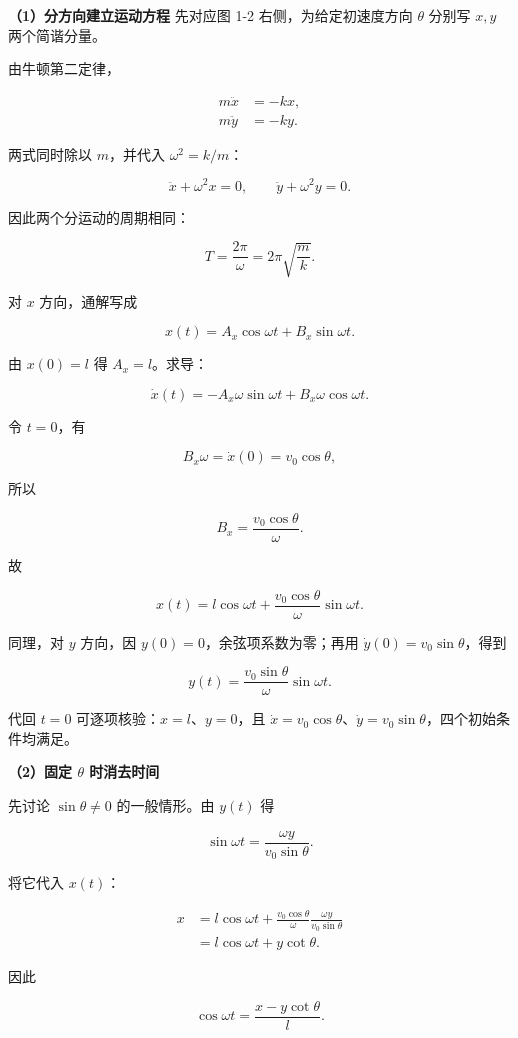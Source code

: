 \documentclass[12pt,a4paper,UTF8]{ctexart}
\begin{document}
\textbf{（1）分方向建立运动方程} 先对应图 1-2 右侧，为给定初速度方向
\(\theta\) 分别写 \(x,y\) 两个简谐分量。

由牛顿第二定律，

\[\begin{aligned}
m\ddot x&=-kx,\\
m\ddot y&=-ky.
\end{aligned}\]

两式同时除以 \(m\)，并代入 \(\omega^2=k/m\)：

\[\ddot x+\omega^2x=0,\qquad \ddot y+\omega^2y=0.\]

因此两个分运动的周期相同：

\[\boxed{T=\frac{2\pi}{\omega}=2\pi\sqrt{\frac{m}{k}}}.\]

对 \(x\) 方向，通解写成

\[x(t)=A_x\cos\omega t+B_x\sin\omega t.\]

由 \(x(0)=l\) 得 \(A_x=l\)。求导：

\[\dot x(t)=-A_x\omega\sin\omega t+B_x\omega\cos\omega t.\]

令 \(t=0\)，有

\[B_x\omega=\dot x(0)=v_0\cos\theta,\]

所以

\[B_x=\frac{v_0\cos\theta}{\omega}.\]

故

\[\boxed{x(t)=l\cos\omega t+\frac{v_0\cos\theta}{\omega}\sin\omega t}.\]

同理，对 \(y\) 方向，因 \(y(0)=0\)，余弦项系数为零；再用
\(\dot y(0)=v_0\sin\theta\)，得到

\[\boxed{y(t)=\frac{v_0\sin\theta}{\omega}\sin\omega t}.\]

代回 \(t=0\) 可逐项核验：\(x=l\)、\(y=0\)，且
\(\dot x=v_0\cos\theta\)、\(\dot y=v_0\sin\theta\)，四个初始条件均满足。

\textbf{（2）固定 \(\theta\) 时消去时间}

先讨论 \(\sin\theta\neq0\) 的一般情形。由 \(y(t)\) 得

\[\sin\omega t=\frac{\omega y}{v_0\sin\theta}.\]

将它代入 \(x(t)\)：

\[\begin{aligned}
x&=l\cos\omega t+\frac{v_0\cos\theta}{\omega}
\frac{\omega y}{v_0\sin\theta}\\
&=l\cos\omega t+y\cot\theta.
\end{aligned}\]

因此

\[\cos\omega t=\frac{x-y\cot\theta}{l}.\]
\end{document}
